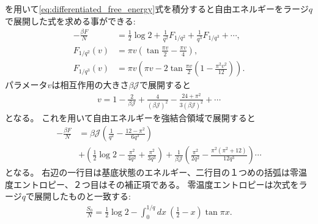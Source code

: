 を用いて\eqref{eq:differentiated_free_energy}式を積分すると自由エネルギーをラージ$q$
で展開した式を求める事ができる:
\begin{align}
	-\frac{\beta F}{N} &= \frac{1}{2}\log 2 + \frac{1}{q^2}F_{1/q^2}
		+ \frac{1}{q^3}F_{1/q^3} + \cdots,\\
	F_{1/q^2}(v) &= \pi v \left(\tan \frac{\pi v}{2} - \frac{\pi v}{4}\right),\\
	F_{1/q^3}(v) &= \pi v \left(
	\pi v - 2\tan \frac{\pi v}{2}\left(1 - \frac{\pi^2 v^2}{12}\right)
	\right).
\end{align}
パラメータ$v$は相互作用の大きさ$\beta\mathcal{J}$で展開すると
\begin{align}
	v = 1 - \frac{2}{\beta\mathcal{J}} + \frac{4}{(\beta\mathcal{J})^2}
		- \frac{24 + \pi^2}{3(\beta\mathcal{J})^2} + \cdots
\end{align}
となる。
これを用いて自由エネルギーを強結合領域で展開すると
\begin{align}
	-\frac{\beta F}{N}
	&= \beta\mathcal{J}\left(\frac{1}{q^2} - \frac{12 - \pi^2}{6q^3}\right)\nonumber\\
	&+ \left(\frac{1}{2}\log 2 - \frac{\pi^2}{4q^2} + \frac{\pi^2}{3q^3}\right)
	+ \frac{1}{\beta\mathcal{J}}\left(
		\frac{\pi^2}{2q^2} - \frac{\pi^2(\pi^2 + 12)}{12q^3}
	\right)\cdots
	\label{eq:expanded_free_energy}
\end{align}
となる。
右辺の一行目は基底状態のエネルギー、二行目の１つめの括弧は零温度エントロピー、２つ目はその補正項である。
零温度エントロピーは次式をラージ$q$で展開したものと一致する\cite{maldacena}:
\begin{align}
	\frac{S_0}{N}
		= \frac{1}{2}\log 2 - \int_0^{1/q} dx\ \left(\frac{1}{2} - x\right)\tan \pi x.
\end{align}

\pagebreak
